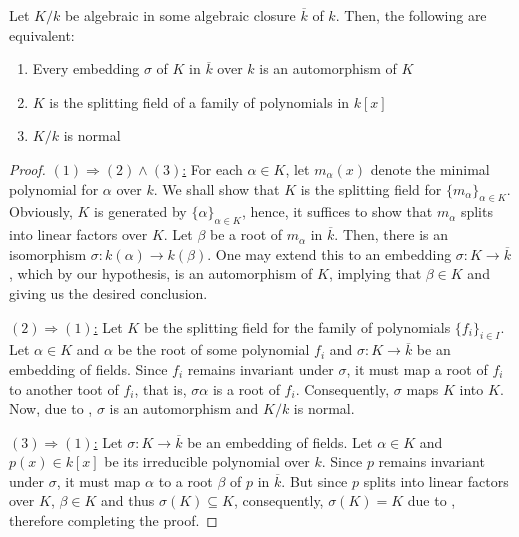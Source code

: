 \begin{theorem}
    Let $K/k$ be algebraic in some algebraic closure $\overline{k}$ of $k$. Then, the following are equivalent: 
    \begin{enumerate}
        \item Every embedding $\sigma$ of $K$ in $\overline{k}$ over $k$ is an automorphism of $K$ 
        \item $K$ is the splitting field of a family of polynomials in $k[x]$
        \item $K/k$ is normal
    \end{enumerate}
\end{theorem}
\begin{proof}
\hfill 

\noindent\underline{$(1)\Longrightarrow(2)\wedge(3)$:} For each $\alpha\in K$, let $m_\alpha(x)$ denote the minimal polynomial for $\alpha$ over $k$. We shall show that $K$ is the splitting field for $\{m_\alpha\}_{\alpha\in K}$. Obviously, $K$ is generated by $\{\alpha\}_{\alpha\in K}$, hence, it suffices to show that $m_\alpha$ splits into linear factors over $K$. Let $\beta$ be a root of $m_\alpha$ in $\overline{k}$. Then, there is an isomorphism $\sigma: k(\alpha)\to k(\beta)$. One may extend this to an embedding $\sigma: K\to\overline{k}$, which by our hypothesis, is an automorphism of $K$, implying that $\beta\in K$ and giving us the desired conclusion.

\noindent\underline{$(2)\Longrightarrow(1)$:} Let $K$ be the splitting field for the family of polynomials $\{f_i\}_{i\in I}$. Let $\alpha\in K$ and $\alpha$ be the root of some polynomial $f_i$ and $\sigma: K\to\overline k$ be an embedding of fields. Since $f_i$ remains invariant under $\sigma$, it must map a root of $f_i$ to another toot of $f_i$, that is, $\sigma\alpha$ is a root of $f_i$. Consequently, $\sigma$ maps $K$ into $K$. Now, due to , $\sigma$ is an automorphism and $K/k$ is normal.

\noindent\underline{$(3)\Longrightarrow(1)$:} Let $\sigma: K\to\overline{k}$ be an embedding of fields. Let $\alpha\in K$ and $p(x)\in k[x]$ be its irreducible polynomial over $k$. Since $p$ remains invariant under $\sigma$, it must map $\alpha$ to a root $\beta$ of $p$ in $\overline{k}$. But since $p$ splits into linear factors over $K$, $\beta\in K$ and thus $\sigma(K)\subseteq K$, consequently, $\sigma(K) = K$ due to , therefore completing the proof.
\end{proof}


